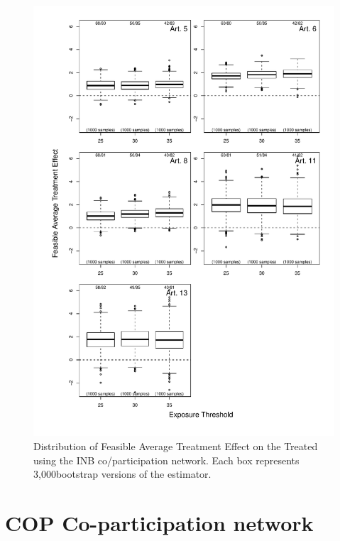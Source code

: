 \documentclass[10pt]{article}
\def\nreps{3,000}
\begin{document}
\begin{figure}[H]
	\centering
	\includegraphics[width=.8\linewidth]{../fig/matching_bloxplot_adjmat_fctc_inb_coparticipation_twomode.pdf}
	\caption{Distribution of Feasible Average Treatment Effect on the Treated using the INB co/participation network. Each box represents \nreps bootstrap versions of the estimator.}
\end{figure}

\section{COP Co-participation network}
\end{document}
